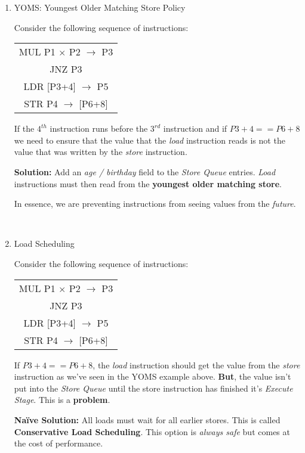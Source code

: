 \documentclass[12pt]{article}
\newenvironment{QandA}{\begin{enumerate}[label=\bfseries\arabic*.]\bfseries}
                      {\end{enumerate}}
\newenvironment{answered}{\par\quad\normalfont}{}
\begin{document}
\begin{QandA}
\

\item YOMS: Youngest Older Matching Store Policy
\begin{answered}
Consider the following sequence of instructions:
\begin{center}
\begin{tabular}{ |c| } 
 \hline
 MUL P1 $\times$ P2 $\rightarrow$ P3 \\ 
 JNZ P3 \\ 
 LDR [P3+4] $\rightarrow$ P5 \\
 STR P4 $\rightarrow$ [P6+8] \\
 \hline
\end{tabular}
\end{center}

If the $4^{th}$ instruction runs before the $3^{rd}$ instruction and if $P3+4==P6+8$ we need to ensure that the value that the \textit{load} instruction reads is not the value that was written by the \textit{store} instruction. 

\textbf{Solution:} Add an \textit{age / birthday} field to the \textit{Store Queue} entries. \textit{Load} instructions must then read from the \textbf{youngest older matching store}. 

In essence, we are preventing instructions from seeing values from the \textit{future}. 
\end{answered}

\

\item Load Scheduling
\begin{answered}
Consider the following sequence of instructions:
\begin{center}
\begin{tabular}{ |c| } 
 \hline
 MUL P1 $\times$ P2 $\rightarrow$ P3 \\ 
 JNZ P3 \\ 
 LDR [P3+4] $\rightarrow$ P5 \\
 STR P4 $\rightarrow$ [P6+8] \\
 \hline
\end{tabular}
\end{center}

If $P3+4==P6+8$, the \textit{load} instruction should get the value from the \textit{store} instruction as we've seen in the YOMS example above. \textbf{But}, the value isn't put into the \textit{Store Queue} until the store instruction has finished it's \textit{Execute Stage}. This is a \textbf{problem}. 

\textbf{Na\"ive Solution:} All loads must wait for all earlier stores. This is called \textbf{Conservative Load Scheduling}. This option is \textit{always safe} but comes at the cost of performance. 


\end{answered}
\end{QandA}
\end{document}
